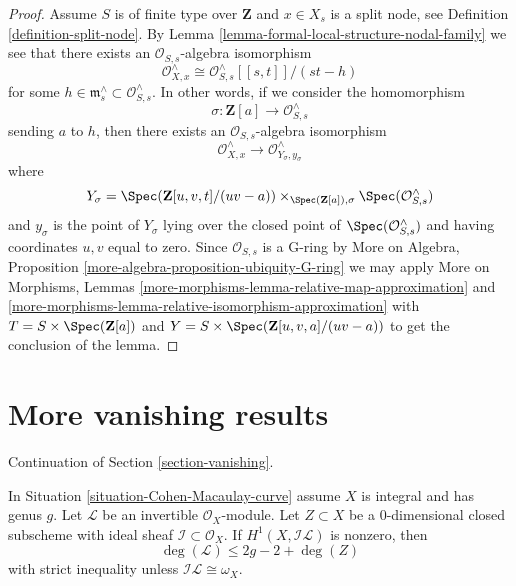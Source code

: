 \begin{proof}
\medskip\noindent
Assume $S$ is of finite type over $\mathbf{Z}$ and
$x \in X_s$ is a split node, see Definition \ref{definition-split-node}.
By Lemma \ref{lemma-formal-local-structure-nodal-family} we see that there
exists an $\mathcal{O}_{S, s}$-algebra isomorphism
$$
\mathcal{O}_{X, x}^\wedge \cong
\mathcal{O}_{S, s}^\wedge[[s, t]]/(st - h)
$$
for some $h \in \mathfrak m_s^\wedge \subset \mathcal{O}_{S, s}^\wedge$.
In other words, if we consider the homomorphism
$$
\sigma : \mathbf{Z}[a] \longrightarrow \mathcal{O}_{S, s}^\wedge
$$
sending $a$ to $h$, then there exists an $\mathcal{O}_{S, s}$-algebra
isomorphism
$$
\mathcal{O}_{X, x}^\wedge
\longrightarrow
\mathcal{O}_{Y_\sigma, y_\sigma}^\wedge
$$
where
$$
Y_\sigma = \Spec(\mathbf{Z}[u, v, t]/(uv - a))
\times_{\Spec(\mathbf{Z}[a]), \sigma} \Spec(\mathcal{O}_{S, s}^\wedge)
$$
and $y_\sigma$ is the point of $Y_\sigma$ lying over
the closed point of $\Spec(\mathcal{O}_{S, s}^\wedge)$
and having coordinates $u, v$ equal to zero. Since
$\mathcal{O}_{S, s}$ is a G-ring by
More on Algebra, Proposition \ref{more-algebra-proposition-ubiquity-G-ring}
we may apply More on Morphisms, Lemmas
\ref{more-morphisms-lemma-relative-map-approximation} and
\ref{more-morphisms-lemma-relative-isomorphism-approximation}
with $T = S \times \Spec(\mathbf{Z}[a])$ and
$Y = S \times \Spec(\mathbf{Z}[u, v, a]/(uv -a))$
to get the conclusion of the lemma.
\end{proof}







\section{More vanishing results}
\label{section-more-vanishing}

\noindent
Continuation of Section \ref{section-vanishing}.

\begin{lemma}
\label{lemma-h1-nonzero-degree-leq-2g-2}
In Situation \ref{situation-Cohen-Macaulay-curve} assume $X$ is integral and
has genus $g$. Let $\mathcal{L}$ be an invertible $\mathcal{O}_X$-module.
Let $Z \subset X$ be a $0$-dimensional closed subscheme with ideal
sheaf $\mathcal{I} \subset \mathcal{O}_X$. If $H^1(X, \mathcal{I}\mathcal{L})$
is nonzero, then
$$
\deg(\mathcal{L}) \leq 2g - 2 + \deg(Z)
$$
with strict inequality unless $\mathcal{I}\mathcal{L} \cong \omega_X$.
\end{lemma}

